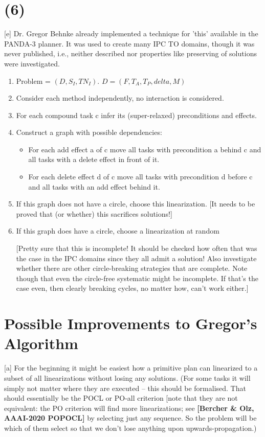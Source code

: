 \section{(6)}
[e] Dr. Gregor Behnke already implemented a technique for 'this' available in the PANDA-3 planner. It was used to create many IPC TO domains, though it was never published, i.e., neither described nor properties like preserving of solutions were investigated.

\begin{enumerate}
	\item Problem = $(D, S_I, TN_I).$   $D = (F, T_A, T_P, delta, M)$ 
	\item Consider each method independently, no interaction is considered.
	\item For each compound task c infer its (super-relaxed) preconditions and effects. 
	\item Construct a graph with possible dependencies:  
        \begin{itemize}
        	\item  For each add effect a of c move all tasks with precondition a behind c and all tasks with a delete effect in front of it.  
        	\item  For each delete effect d of c move all tasks with precondition d before c
                	and all tasks with an add effect behind it.
        \end{itemize} 
    \item If this graph does not have a circle, choose this linearization. 
[It needs to be proved that (or whether) this sacrifices solutions!]
    \item If this graph does have a circle, choose a linearization at random
    
[Pretty sure that this is incomplete! It should be checked how often that
was the case in the IPC domains since they all admit a solution! Also
investigate whether there are other circle-breaking strategies that are
complete. Note though that even the circle-free systematic might be
incomplete. If that's the case even, then clearly breaking cycles, no
matter how, can't work either.]
\end{enumerate}


\section{Possible Improvements to Gregor's Algorithm}

[a] For the beginning it might be easiest how a primitive plan can linearized to a subset of all linearizations without losing any solutions. (For some tasks it will simply not matter where they are executed -- this should be formalised. That should essentially be the POCL or PO-all criterion [note that they are not equivalent: the PO criterion will find more linearizations; see \textbf{[Bercher \& Olz, AAAI-2020 POPOCL]} by selecting just any sequence. So the problem will be which of them select so that we don't lose anything upon upwards-propagation.)

